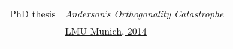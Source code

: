 \documentclass[11pt,english,a4paper]{memoir}
\makeatletter
\newcommand{\muelleratlmudotde}{mue\rlap{\textcolor{white}{hugo@egon}}ll\rlap{\textcolor{white}{@symmetry is overrated}}er@\rlap{\textcolor{white}{yesihatespamspamspam}}l\rlap{\textcolor{white}{spam@spam@spam!}}mu\rlap{\textcolor{white}{.com}}.de}
\newcommand{\juergenvoigtattudresdende}{juer\rlap{\textcolor{white}{hugo@egon}}gen.voi\rlap{\textcolor{white}{@symmetry is overrated}}gt@\rlap{\textcolor{white}{yesihatespamspamspam}}tu-\rlap{\textcolor{white}{spam@spam@spam!}}dres\rlap{\textcolor{white}{.com}}den.de}
\newcommand{\red}{\color{Maroon}}
\newcommand{\header}[1]{%
  \addlinespace[2ex]
  & \large{\red\textsc{\MakeLowercase{#1}}} \tabularnewline
  \midrule}
\newcommand{\n}{\tabularnewline}
\makeatother
\begin{document}
\begin{center}
\begin{tabular}{rl}
  PhD thesis & \textit{Anderson's Orthogonality Catastrophe} \\
  & \href{http://edoc.ub.uni-muenchen.de/17442/}{LMU Munich, 2014} \n \addlinespace



\end{tabular}

\end{center}


\end{document}
